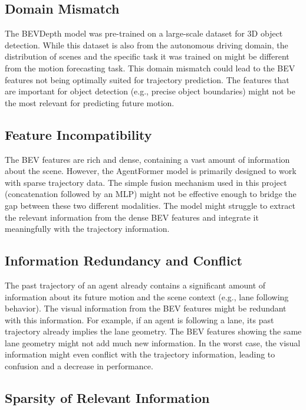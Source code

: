 \subsection{Domain Mismatch}

The BEVDepth model was pre-trained on a large-scale dataset for 3D object detection. While this dataset is also from the autonomous driving domain, the distribution of scenes and the specific task it was trained on might be different from the motion forecasting task. This domain mismatch could lead to the BEV features not being optimally suited for trajectory prediction. The features that are important for object detection (e.g., precise object boundaries) might not be the most relevant for predicting future motion.

\subsection{Feature Incompatibility}

The BEV features are rich and dense, containing a vast amount of information about the scene. However, the AgentFormer model is primarily designed to work with sparse trajectory data. The simple fusion mechanism used in this project (concatenation followed by an MLP) might not be effective enough to bridge the gap between these two different modalities. The model might struggle to extract the relevant information from the dense BEV features and integrate it meaningfully with the trajectory information.

\subsection{Information Redundancy and Conflict}

The past trajectory of an agent already contains a significant amount of information about its future motion and the scene context (e.g., lane following behavior). The visual information from the BEV features might be redundant with this information. For example, if an agent is following a lane, its past trajectory already implies the lane geometry. The BEV features showing the same lane geometry might not add much new information. In the worst case, the visual information might even conflict with the trajectory information, leading to confusion and a decrease in performance.

\subsection{Sparsity of Relevant Information}

